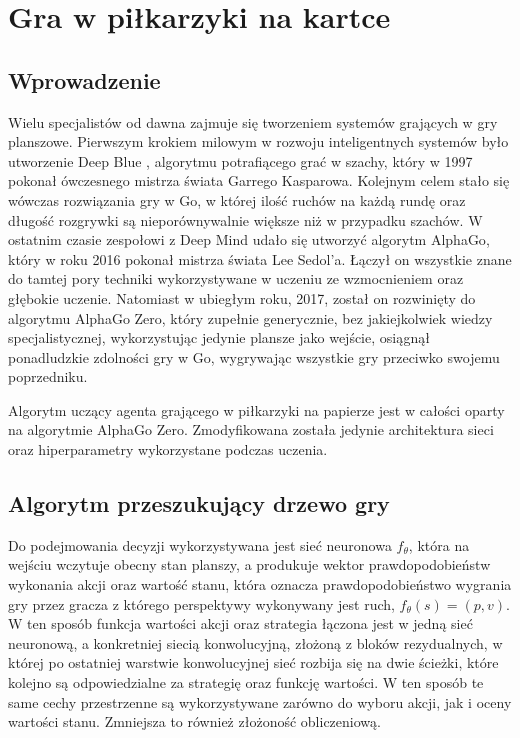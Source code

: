 \documentclass[licencjacka]{pracamgr}
\begin{document}
\chapter{Gra w piłkarzyki na kartce}

\section{Wprowadzenie}

Wielu specjalistów od dawna zajmuje się tworzeniem systemów grających w gry planszowe. Pierwszym krokiem milowym w rozwoju inteligentnych systemów było utworzenie Deep Blue \cite{deep-blue}, algorytmu potrafiącego grać w szachy, który w 1997 pokonał ówczesnego mistrza świata Garrego Kasparowa. Kolejnym celem stało się wówczas rozwiązania gry w Go, w której ilość ruchów na każdą rundę oraz długość rozgrywki są nieporównywalnie większe niż w przypadku szachów. W ostatnim czasie zespołowi z Deep Mind udało się utworzyć algorytm AlphaGo\cite{alphago2016}, który w roku 2016 pokonał mistrza świata Lee Sedol'a. Łączył on wszystkie znane do tamtej pory techniki wykorzystywane w uczeniu ze wzmocnieniem oraz głębokie uczenie. Natomiast w ubiegłym roku, 2017, został on rozwinięty do algorytmu AlphaGo Zero\cite{alphagozero}, który zupełnie generycznie, bez jakiejkolwiek wiedzy specjalistycznej, wykorzystując jedynie plansze jako wejście, osiągnął ponadludzkie zdolności gry w Go, wygrywając wszystkie gry przeciwko swojemu poprzedniku. 

Algorytm uczący agenta grającego w piłkarzyki na papierze jest w całości oparty na algorytmie AlphaGo Zero. Zmodyfikowana została jedynie architektura sieci oraz hiperparametry wykorzystane podczas uczenia.

\section{Algorytm przeszukujący drzewo gry}

Do podejmowania decyzji wykorzystywana jest sieć neuronowa $f_\theta$, która na wejściu wczytuje obecny stan planszy, a produkuje wektor prawdopodobieństw wykonania akcji oraz wartość stanu, która oznacza prawdopodobieństwo wygrania gry przez gracza z którego perspektywy wykonywany jest ruch, $f_\theta(s) = (p, v)$. W ten sposób funkcja wartości akcji oraz strategia łączona jest w jedną sieć neuronową, a konkretniej siecią konwolucyjną, złożoną z bloków rezydualnych, w której po ostatniej warstwie konwolucyjnej sieć rozbija się na dwie ścieżki, które kolejno są odpowiedzialne za strategię oraz funkcję wartości. W ten sposób te same cechy przestrzenne są wykorzystywane zarówno do wyboru akcji, jak i oceny wartości stanu. Zmniejsza to również złożoność obliczeniową.
\end{document}
